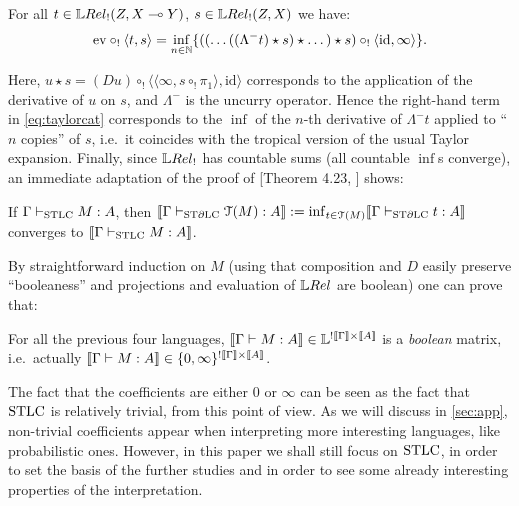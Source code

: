 \begin{theorem}\label{thm:modelsTaylor}
 For all $t\in\HOM{\LREL_!}{Z}{X\multimap Y}$, $s\in\HOM{\LREL_!}{Z}{X}$ we have:%
 \begin{align}\label{eq:taylorcat}
  \mathrm{ev}\circ_!\langle t,s\rangle =
  \inf\limits_{n\in\mathbb{N}}
  \{((\dots((\Lambda^- t)\star s)\star \dots)\star s)\circ_! \langle \mathrm{id},\infty \rangle\}.
 \end{align} 
\end{theorem}
Here,
$u\star s= (Du)\circ_{!} \langle \langle  \infty, s\circ_{!} \pi_{1}\rangle,\mathrm{id}\rangle$ corresponds to the application of the derivative of $u$ on $s$, and $\Lambda^-$ is the uncurry operator.
Hence the right-hand term in \eqref{eq:taylorcat} corresponds to the $\inf$ of the $n$-th derivative of $\Lambda^{-}t$ applied to ``$n$ copies'' of $s$,  i.e.~it coincides with the tropical %
version of the usual Taylor expansion.
Finally, since $\LREL_!$ has countable sums (all countable $\inf$s converge), an immediate adaptation of the proof of [Theorem 4.23, \cite{Manzo2012}] shows:

\begin{corollary}\label{cor:T(M)=M}
 If $\Gamma\vdash_{\mathrm{STLC}} M:A$, then $\llbracket\Gamma\vdash_{\mathrm{ST}\partial\mathrm{LC}} \mathcal{T}(M):A\rrbracket:=\inf_{t\in\mathcal{T}(M)} \llbracket\Gamma\vdash_{\mathrm{ST}\partial\mathrm{LC}} t:A\rrbracket$ converges to $\llbracket\Gamma\vdash_{\mathrm{STLC}} M:A\rrbracket$. %
\end{corollary}

By straightforward induction on $M$ (using that composition and $D$ easily preserve ``booleaness'' and projections and evaluation of  $\LREL$ are boolean) one can prove that:

\begin{proposition}\label{prop:descrete}
 For all the previous four languages, $\llbracket\Gamma\vdash M:A\rrbracket\in\mathbb{L}^{!\llbracket\Gamma\rrbracket\times\llbracket A\rrbracket}$ is a \emph{boolean} matrix, i.e.\ actually $\llbracket\Gamma\vdash M:A\rrbracket\in\{0,\infty\}^{!\llbracket\Gamma\rrbracket\times\llbracket A\rrbracket}$.
\end{proposition}

The fact that the coefficients are either $0$ or $\infty$ can be seen as the fact that $\mathrm{STLC}$ is relatively trivial, from this point of view.
As we will discuss in \autoref{sec:app}, non-trivial coefficients appear when interpreting more interesting languages, like probabilistic ones.
However, in this paper we shall still focus on $\mathrm{STLC}$, in order to set the basis of the further studies and in order to see some already interesting properties of the interpretation.



